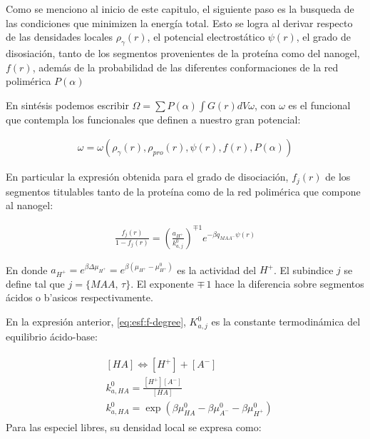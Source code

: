 Como se menciono al inicio de este capitulo, el siguiente paso es la busqueda de las condiciones que minimizen la energ\'ia total. Esto se logra al derivar respecto de las densidades locales $\rho_\gamma(r)$, el potencial electrost\'atico $\psi(r)$, el grado de disosiaci\'on, tanto de los segmentos provenientes de la prote\'ina como del nanogel, $f(r)$, adem\'as de la probabilidad de las diferentes conformaciones de la red polim\'erica $P(\alpha)$

En sint\'esis podemos escribir $\Omega = \sum P(\alpha) \int{G(r) dV\omega}$,  con $\omega$ es el funcional que contempla los funcionales que definen a nuestro gran potencial: 

\begin{align}
	\omega=\omega(\rho_\gamma(r), \rho_{pro}(r),\psi(r),f(r),P(\alpha))
	\label{eq:esf:funcionales-omega}
\end{align}


En particular la expresi\'on obtenida para el grado de disociaci\'on, $f_j(r)$ de los segmentos titulables tanto de la prote\'ina como de la red polim\'erica que compone al nanogel:

\begin{align}
	\frac{f_j(r)}{1-f_j(r)}= \left(\frac{a_{H^+}}{k^0_{a,j}}\right)^{\mp 1} e^{-\beta q_{MAA^-}\psi(r)}
	\label{eq:esf:f-degree}
\end{align}

\noindent En donde  $a_{H^+}=e^{\beta\Delta\mu_{H^+}}=e^{\beta(\mu_{H^+} -\mu^0_{H^+})}$ es la actividad del $H^+$. El subindice  $j$ se define tal que  $j =\{MAA , \, \tau \}$. El exponente $\mp \, 1$ hace la diferencia sobre segmentos \'acidos o b'asicos respectivamente.

En la expresi\'on anterior, \ref{eq:esf:f-degree}, $K^0_{a,j}$ es la constante termodin\'amica del equilibrio \'acido-base:

\begin{align}
	\begin{aligned}
		& \left[HA\right] \Longleftrightarrow [H^+] +[A^-] \\
		& k_{a,HA}^0=\frac{[H^+][A^-]}{[HA]} \\
		& k_{a,HA}^0=\exp\left(\beta\mu_{HA}^0 - \beta \mu_{A^-}^0 - \beta \mu^0_{H^+} \right)
	\end{aligned}
	\label{eq:esf:dis-rxn}
\end{align}
Para las especiel libres, su densidad local se expresa como:


